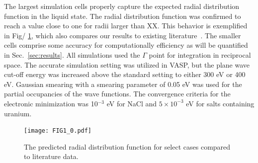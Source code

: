 \documentclass[preprint,3p,10pt,twocolumn,number,sort&compress]{elsarticle}
\begin{document}
The largest simulation cells properly capture the expected radial distribution function in the liquid state. The radial distribution function was confirmed to reach a value close to one for  radii larger than XX. This behavior is exemplified in Fig/ \ref{fig:radial}, which also compares our results to existing literature~\cite{}. The smaller cells comprise some accuracy for computationally efficiency as will be quantified in Sec.~\ref{sec:results}. All simulations used the $\Gamma$ point for integration in reciprocal space. The accurate simulation setting was utilized in VASP, but the plane wave cut-off energy was increased above the standard setting to either 300 eV or 400 eV. Gaussian smearing with a smearing parameter of 0.05 eV was used for the partial occupancies of the wave functions. The convergence criteria for the electronic minimization was 10$^{-3}$ eV for NaCl and $5\times10^{-3}$ eV for salts containing uranium. 



\begin{figure}[htb]
\centering
\texttt{[image: FIG1\_0.pdf]}
\caption{The predicted radial distribution function for select cases compared to literature data. } 
\label{fig:radial}
\end{figure}
\end{document}
